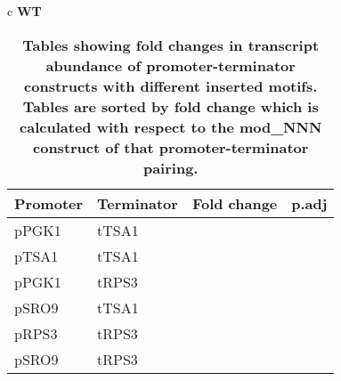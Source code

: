 \documentclass[../main.tex]{subfiles}
\begin{document}
\begin{table}[ph!]
{\begin{tabular}{ c }
 \textbf{WT} \\
\begin{tabularx}{0.8\textwidth} { 
  | >{\centering\arraybackslash}X 
  | >{\centering\arraybackslash}X  
  | >{\centering\arraybackslash}X
  | >{\centering\arraybackslash}X | }
\hline
\textbf{Promoter} & \textbf{Terminator} & \textbf{Fold change} & \textbf{p.adj}\\
\hline
pPGK1 & tTSA1 & 0.7338775 & 0.130\\
\hline
pTSA1 & tTSA1 & 0.7371346 & 0.110\\
\hline
pPGK1 & tRPS3 & 0.9530783 & 0.830\\
\hline
pSRO9 & tTSA1 & 1.0705360 & 0.620\\
\hline
pRPS3 & tRPS3 & 1.3474065 & 0.033\\
\hline
pSRO9 & tRPS3 & 1.4012037 & 0.093\\
\hline
\end{tabularx}
\end{tabular}}\endgroup{}\caption[Tables showing fold changes in transcript abundance of promoter-terminator constructs with different inserted motifs.]{\textbf{Tables showing fold changes in transcript abundance of promoter-terminator constructs with different inserted motifs. Tables are sorted by fold change which is calculated with respect to the mod\_NNN construct of that promoter-terminator pairing.}}\label{tab:insertion-construct-ttest}\end{table}
\end{document}
